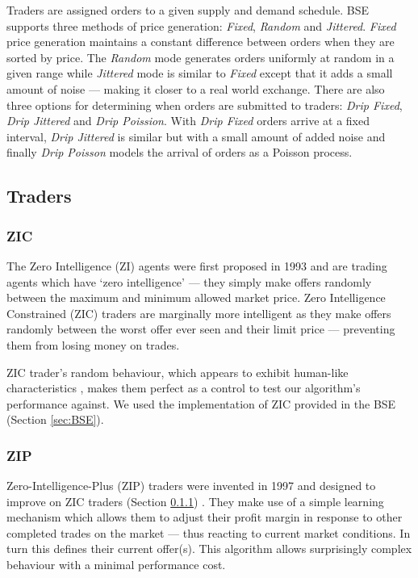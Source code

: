 \documentclass[preprint]{acm_proc_article-sp} %
\begin{document}
Traders are assigned orders to a given supply and demand schedule. BSE supports three methods of price 
generation: \emph{Fixed}, \emph{Random} and \emph{Jittered}. \emph{Fixed} price generation maintains 
a constant difference between orders when they are sorted by price. The \emph{Random} mode generates 
orders uniformly at random in a given range while \emph{Jittered} mode is similar to \emph{Fixed} 
except that it adds a small amount of noise --- making it closer to a real world exchange. There are 
also three options for determining when orders are submitted to traders: \emph{Drip Fixed}, 
\emph{Drip Jittered} and \emph{Drip Poission}. With \emph{Drip Fixed} orders arrive at a fixed 
interval, \emph{Drip Jittered} is similar but with a small amount of added noise and finally 
\emph{Drip Poisson} models the arrival of orders as a Poisson process.\\



\subsection{Traders} \label{sec:traders}
\subsubsection{ZIC} \label{sec:traders_ZIC}
The Zero Intelligence (ZI) agents were first proposed in 1993 \cite{ZIC_paper} and are trading agents 
which have `zero intelligence' --- they simply make offers randomly between the maximum and minimum 
allowed market price. Zero Intelligence Constrained (ZIC) traders are marginally more intelligent as 
they make offers randomly between the worst offer ever seen and their limit price --- preventing them 
from losing money on trades.

ZIC trader's random behaviour, which appears to exhibit human-like characteristics \cite[p.~1]{ZIP_paper1}, 
makes them perfect as a control to test our algorithm's performance against. We used the 
implementation of ZIC provided in the BSE (Section \ref{sec:BSE}).\\



\subsubsection{ZIP} \label{sec:traders_ZIP}
Zero-Intelligence-Plus (ZIP) traders were invented in 1997 and designed to improve on ZIC traders 
(Section \ref{sec:traders_ZIC}) \cite{ZIP_paper1}. They make use of a simple learning mechanism which 
allows them to adjust their profit margin in response to other completed trades on the market --- thus reacting to 
current market conditions. In turn this defines their current offer(s). This algorithm allows surprisingly complex behaviour with a 
minimal performance cost.
\end{document}
